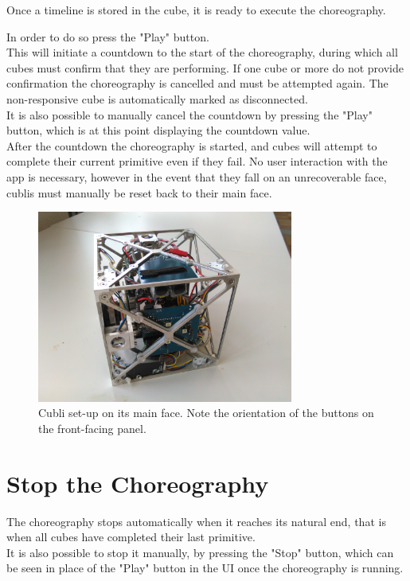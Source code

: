 Once a timeline is stored in the cube, it is ready to execute the choreography. 

In order to do so press the "Play" button.\\

This will initiate a countdown to the start of the choreography, during which all cubes must confirm that they are performing. If one cube or more do not provide confirmation the choreography is cancelled and must be attempted again. The non-responsive cube is automatically marked as disconnected.\\

It is also possible to manually cancel the countdown by pressing the "Play" button, which is at this point displaying the countdown value.\\

After the countdown the choreography is started, and cubes will attempt to complete their current primitive even if they fail. No user interaction with the app is necessary, however in the event that they fall on an unrecoverable face, cublis must manually be reset back to their main face.

\begin{figure}[ht]
   \centering
   \includegraphics[width=0.75\textwidth]{img/MainFace.jpg}
   \caption{Cubli set-up on its main face. Note the orientation of the buttons on the front-facing panel.}
   \label{img:MainFace}
\end{figure}


\section{Stop the Choreography}

The choreography stops automatically when it reaches its natural end, that is when all cubes have completed their last primitive. \\

It is also possible to stop it manually, by pressing the "Stop" button, which can be seen in place of the "Play" button in the UI once the choreography is running.

